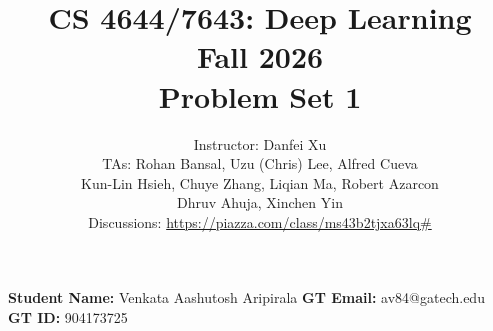\documentclass[11pt,english]{article}
\begin{document}
\title{CS 4644/7643: Deep Learning\\
Fall 2026 \\
Problem Set 1}

\author{Instructor: Danfei Xu \\
TAs: Rohan Bansal, Uzu (Chris) Lee, Alfred Cueva  \\
Kun-Lin Hsieh, Chuye Zhang, Liqian Ma, Robert Azarcon  \\
Dhruv Ahuja, Xinchen Yin \\
Discussions: \url{https://piazza.com/class/ms43b2tjxa63lq\#}}
\maketitle

\begin{center}
    \textbf{Student Name:} Venkata Aashutosh Aripirala \quad \textbf{GT Email:} av84@gatech.edu \quad \textbf{GT ID:} 904173725
\end{center}
\end{document}
